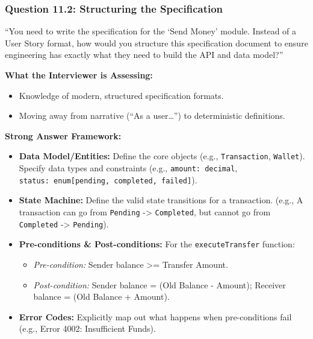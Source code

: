 \documentclass[
  11pt,
  openany,
  oneside]{book}
\providecommand{\tightlist}{%
  \setlength{\itemsep}{0pt}\setlength{\parskip}{0pt}}
\begin{document}
\subsubsection{Question 11.2: Structuring the
Specification}\label{question-11.2-structuring-the-specification}

``You need to write the specification for the `Send Money' module.
Instead of a User Story format, how would you structure this
specification document to ensure engineering has exactly what they need
to build the API and data model?''

\textbf{What the Interviewer is Assessing:}

\begin{itemize}
\tightlist
\item
  Knowledge of modern, structured specification formats.
\item
  Moving away from narrative (``As a user\ldots{}'') to deterministic
  definitions.
\end{itemize}

\textbf{Strong Answer Framework:}

\begin{itemize}
\tightlist
\item
  \textbf{Data Model/Entities:} Define the core objects (e.g.,
  \texttt{Transaction}, \texttt{Wallet}). Specify data types and
  constraints (e.g., \texttt{amount:\ decimal},
  \texttt{status:\ enum{[}pending,\ completed,\ failed{]}}).
\item
  \textbf{State Machine:} Define the valid state transitions for a
  transaction. (e.g., A transaction can go from \texttt{Pending}
  -\textgreater{} \texttt{Completed}, but cannot go from
  \texttt{Completed} -\textgreater{} \texttt{Pending}).
\item
  \textbf{Pre-conditions \& Post-conditions:} For the
  \texttt{executeTransfer} function:

  \begin{itemize}
  \tightlist
  \item
    \emph{Pre-condition:} Sender balance \textgreater= Transfer Amount.
  \item
    \emph{Post-condition:} Sender balance = (Old Balance - Amount);
    Receiver balance = (Old Balance + Amount).
  \end{itemize}
\item
  \textbf{Error Codes:} Explicitly map out what happens when
  pre-conditions fail (e.g., Error 4002: Insufficient Funds).
\end{itemize}
\end{document}
